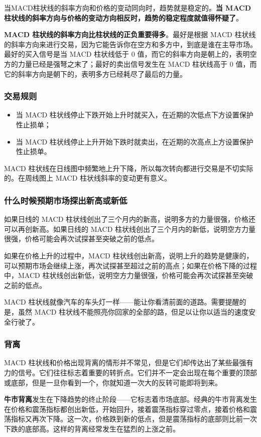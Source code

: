 当MACD柱状线的斜率方向和价格的变动同向时，趋势就是稳定的。\textbf{当 MACD 柱状线的斜率方向与价格的变动方向相反时，趋势的稳定程度就值得怀疑了}。

\textbf{MACD 柱状线的斜率方向比柱状线的正负重要得多}。最好是根据 MACD 柱状线的斜率方向来进行交易，因为它能告诉你在空方和多方中，到底是谁在主导市场。最好的买入信号是当 MACD 柱状线低于 0 值，而它的斜率方向是朝上的，表明空方的力量已经是强弩之末了；最好的卖出信号发生在 MACD 柱状线高于 0 值，而它的斜率方向是朝下的，表明多方已经耗尽了最后的力量。
\subsubsection*{交易规则}
\begin{itemize}
    \item 当 MACD 柱状线停止下跌开始上升时就买入，在近期的次低点下方设置保护性止损单；
    \item 当 MACD 柱状线停止上升开始下跌时就卖出，在近期的次高点上方设置保护性止损单。
\end{itemize}

MACD 柱状线在日线图中频繁地上升下降，所以每次转向都进行交易是不切实际的。在周线图上 MACD 柱状线斜率的变动更有意义。
\subsubsection*{什么时候预期市场探出新高或新低}
如果日线的 MACD 柱状线创出了三个月内的新高，说明多方的力量很强，价格还可以再创新高。如果日线的 MACD 柱状线创出了三个月内的新低，说明空方力量很强，价格可能会再次试探甚至突破之前的低点。

如果在价格上升的过程中，MACD 柱状线创出新高，说明上升的趋势是健康的，可以预期市场会继续上涨，再次试探甚至超过之前的高点；如果在价格下降的过程中，MACD 柱状线创出新低，说明空方力量很强，价格可能会再次试探甚至突破之前的低点。

MACD 柱状线就像汽车的车头灯一样——能让你看清前面的道路。需要提醒的是，虽然 MACD 柱状线不能照亮你回家的全部的路，但足以让你以适当的速度安全行驶了。
\subsubsection*{背离}
MACD 柱状线和价格出现背离的情形并不常见，但是它们却传达出了某些最强有力的信号。它们往往标志着重要的转折点。它们并不一定会出现在每个重要的顶部或底部，但是一旦你看到一个，你就知道一次大的反转可能即将到来。

\textbf{牛市背离}发生在下降趋势的终止阶段——它标志着市场底部。经典的牛市背离发生在价格和震荡指标都创出新低，开始回升，接着震荡指标穿过零点，接着价格和震荡指标又再次下降。这一次，价格跌到新的低点，但是震荡指标的底部则比前一次下跌的底部高。这样的背离经常发生在猛烈的上涨之前。

